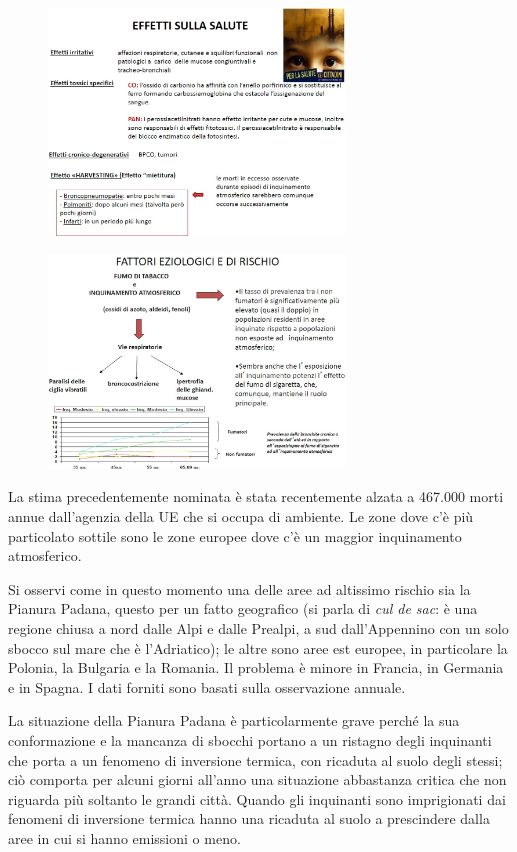 \begin{figure}[!ht]
\centering
	\includegraphics[width=0.7\textwidth]{23/image5.jpg}
	\end{figure}
	
	\begin{figure}[!ht]
	\centering
		\includegraphics[width=0.7\textwidth]{23/image6.jpg}
		\end{figure}

La stima precedentemente nominata è stata recentemente alzata a 467.000
morti annue dall'agenzia della UE che si occupa di ambiente. Le zone
dove c'è più particolato sottile sono le zone europee dove c'è un
maggior inquinamento atmosferico.

Si osservi come in questo momento una delle aree ad altissimo rischio
sia la Pianura Padana, questo per un fatto geografico (si parla di
\emph{cul de sac}: è una regione chiusa a nord dalle Alpi e dalle
Prealpi, a sud dall'Appennino con un solo sbocco sul mare che è
l'Adriatico); le altre sono aree est europee, in particolare la Polonia,
la Bulgaria e la Romania. Il problema è minore in Francia, in Germania e
in Spagna. I dati forniti sono basati sulla osservazione annuale.

La situazione della Pianura Padana è particolarmente grave perché la sua
conformazione e la mancanza di sbocchi portano a un ristagno degli
inquinanti che porta a un fenomeno di inversione termica, con ricaduta
al suolo degli stessi; ciò comporta per alcuni giorni all'anno una
situazione abbastanza critica che non riguarda più soltanto le grandi
città. Quando gli inquinanti sono imprigionati dai fenomeni di
inversione termica hanno una ricaduta al suolo a prescindere dalla aree
in cui si hanno emissioni o meno.

